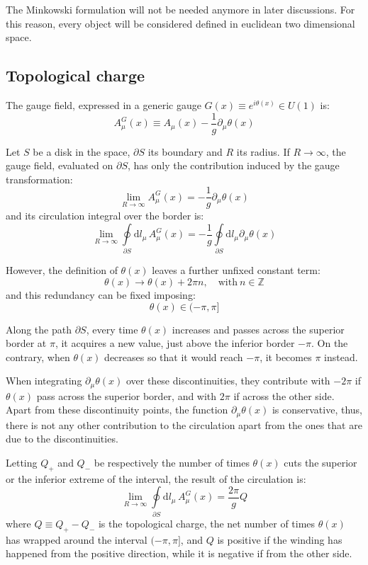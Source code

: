 The Minkowski formulation will not be needed anymore in later discussions.
For this reason, every object will be considered defined in euclidean two dimensional space.

\subsection*{Topological charge}

The gauge field, expressed in a generic gauge $G(x) \equiv e^{i\theta(x)} \in U(1)$ is:
\[
    A^G_\mu(x) \equiv A_\mu(x) - \frac{1}{g}\partial_\mu\theta(x)
\]

Let $S$ be a disk in the space, $\partial S$ its boundary and $R$ its radius.
If $R \to \infty$, the gauge field, evaluated on $\partial S$,
has only the contribution induced by the gauge transformation:
\[
    \lim_{R\to\infty}A^G_\mu(x) = -\frac{1}{g}\partial_\mu\theta(x)
\]
and its circulation integral over the border is:
\[
    \lim_{R\to\infty}\oint\limits_{\partial S}\mathrm dl_\mu\,A^G_\mu(x) = -\frac{1}{g}\oint\limits_{\partial S}\mathrm dl_\mu\partial_\mu\theta(x)
\]

However, the definition of $\theta(x)$ leaves a further unfixed constant term:
\[
    \theta(x) \rightarrow \theta(x) + 2\pi n, \quad \text{with}\ n \in \mathbb Z
\]
and this redundancy can be fixed imposing:
\[
    \theta(x) \in (-\pi,\pi]
\]

Along the path $\partial S$, every time $\theta(x)$ increases and passes across the superior border at $\pi$, it acquires a new value,
just above the inferior border $-\pi$.
On the contrary, when $\theta(x)$ decreases so that it would reach $-\pi$, it becomes $\pi$ instead.

When integrating $\partial_\mu\theta(x)$ over these discontinuities,
they contribute with $-2\pi$ if $\theta(x)$ pass across the superior border, and with $2\pi$ if across the other side.
Apart from these discontinuity points, the function $\partial_\mu\theta(x)$ is conservative, thus,
there is not any other contribution to the circulation apart from the ones that are due to the discontinuities.

Letting $Q_+$ and $Q_-$ be respectively the number of times $\theta(x)$ cuts the superior or the inferior extreme of the interval,
the result of the circulation is:
\[
    \lim_{R\to\infty}\oint\limits_{\partial S}\mathrm dl_\mu\,A^G_\mu(x) = \frac{2\pi}{g} Q
\]
where $Q \equiv Q_+ - Q_-$ is the topological charge, \ie the net number of times $\theta(x)$ has wrapped around the interval $(-\pi,\pi]$,
and $Q$ is positive if the winding has happened from the positive direction, while it is negative if from the other side.

